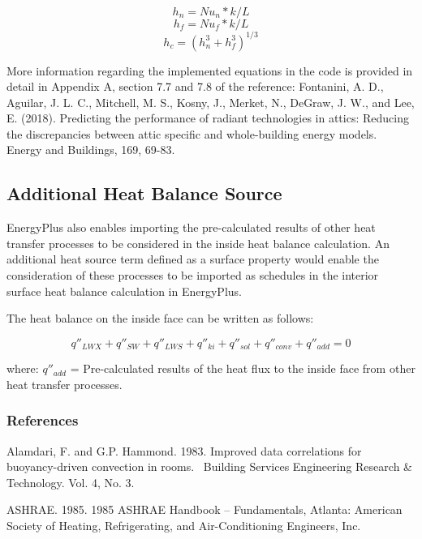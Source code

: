 \begin{equation}
h_n = Nu_n * k / L
\end{equation}
\begin{equation}
h_f = Nu_f * k / L
\end{equation}
\begin{equation}
h_c = {(h_n^3 + h_f^3)}^{1/3}
\end{equation}

More information regarding the implemented equations in the code is provided in detail in Appendix A, section 7.7 and 7.8 of the reference: Fontanini, A. D., Aguilar, J. L. C., Mitchell, M. S., Kosny, J., Merket, N., DeGraw, J. W., and Lee, E. (2018). Predicting the performance of radiant technologies in attics: Reducing the discrepancies between attic specific and whole-building energy models. Energy and Buildings, 169, 69-83.

\subsection{Additional Heat Balance Source}\label{additional-heat-balance-source}

EnergyPlus also enables importing the pre-calculated results of other heat transfer processes to be considered in the inside heat balance calculation. An additional heat source term defined as a surface property would enable the consideration of these processes to be imported as schedules in the interior surface heat balance calculation in EnergyPlus.

The heat balance on the inside face can be written as follows:

\begin{equation}
{q''_{LWX}} + {q''_{SW}} + {q''_{LWS}} + {q''_{ki}} + {q''_{sol}} + {q''_{conv}} + {q''_{add}} = 0
\end{equation}

where:
\(q''_{add}\) = Pre-calculated results of the heat flux to the inside face from other heat transfer processes.

\subsubsection{References}\label{references-032}

Alamdari, F. and G.P. Hammond. 1983. Improved data correlations for buoyancy-driven convection in rooms.~ Building Services Engineering Research \& Technology. Vol. 4, No. 3.

ASHRAE. 1985. 1985 ASHRAE Handbook -- Fundamentals, Atlanta: American Society of Heating, Refrigerating, and Air-Conditioning Engineers, Inc.

